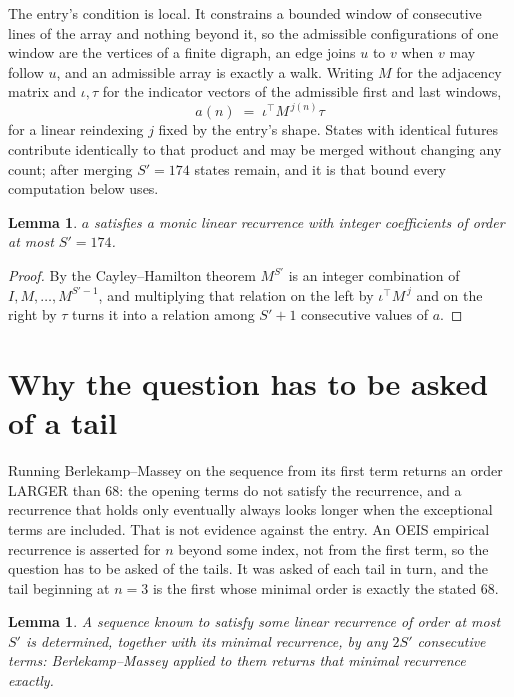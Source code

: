 \documentclass[11pt,a4paper]{article}
\theoremstyle{plain}
\newtheorem{lemma}[theorem]{Lemma}
\theoremstyle{definition}
\begin{document}
The entry's condition is local. It constrains a bounded window of consecutive lines of the
array and nothing beyond it, so the admissible configurations of one window are the vertices of
a finite digraph, an edge joins $u$ to $v$ when $v$ may follow $u$, and an admissible array is
exactly a walk. Writing $M$ for the adjacency matrix and $\iota,\tau$ for the indicator vectors
of the admissible first and last windows,
\[
a(n)\;=\;\iota^{\!\top}M^{\,j(n)}\tau
\]
for a linear reindexing $j$ fixed by the entry's shape. States with identical futures
contribute identically to that product and may be merged without changing any count; after
merging $S'=174$ states remain, and it is that bound every computation below uses.

\begin{lemma}\label{lem:cf}
$a$ satisfies a monic linear recurrence with integer coefficients of order at most $S'=174$.
\end{lemma}

\begin{proof}
By the Cayley--Hamilton theorem $M^{S'}$ is an integer combination of $I,M,\dots,M^{S'-1}$,
and multiplying that relation on the left by $\iota^{\!\top}M^{\,j}$ and on the right by
$\tau$ turns it into a relation among $S'+1$ consecutive values of $a$.
\end{proof}

\section{Why the question has to be asked of a tail}

Running Berlekamp--Massey on the sequence from its first term returns an order LARGER than $68$: the opening terms do not satisfy the recurrence, and a recurrence that holds only eventually always looks longer when the exceptional terms are included. That is not evidence against the entry. An OEIS empirical recurrence is asserted for $n$ beyond some index, not from the first term, so the question has to be asked of the tails. It was asked of each tail in turn, and the tail beginning at $n=3$ is the first whose minimal order is exactly the stated $68$.

\begin{lemma}\label{lem:bm}
A sequence known to satisfy some linear recurrence of order at most $S'$ is determined,
together with its minimal recurrence, by any $2S'$ consecutive terms: Berlekamp--Massey applied
to them returns that minimal recurrence exactly.
\end{lemma}
\end{document}
